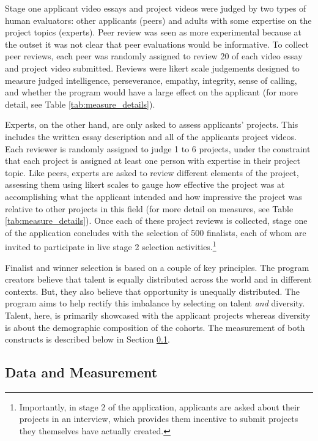 Stage one applicant video essays and project videos were judged by two types of human evaluators: other applicants (peers) and adults with some expertise on the project topics (experts). Peer review was seen as more experimental because at the outset it was not clear that peer evaluations would be informative. To collect peer reviews, each peer was randomly assigned to review 20 of each video essay and project video submitted. Reviews were likert scale judgements designed to measure judged intelligence, perseverance, empathy, integrity, sense of calling, and whether the program would have a large effect on the applicant (for more detail, see Table \ref{tab:measure_details}). 

Experts, on the other hand, are only asked to assess applicants' projects. This includes the written essay description and all of the applicants project videos. Each reviewer is randomly assigned to judge 1 to 6 projects, under the constraint that each project is assigned at least one person with expertise in their project topic. Like peers, experts are asked to review different elements of the project, assessing them using likert scales to gauge how effective the project was at accomplishing what the applicant intended and how impressive the project was relative to other projects in this field (for more detail on measures, see Table \ref{tab:measure_details}). Once each of these project reviews is collected, stage one of the application concludes with the selection of 500 finalists, each of whom are invited to participate in live stage 2 selection activities.\footnote{Importantly, in stage 2 of the application, applicants are asked about their projects in an interview, which provides them incentive to submit projects they themselves have actually created.} 

Finalist and winner selection is based on a couple of key principles. The program creators believe that talent is equally distributed across the world and in different contexts. But, they also believe that opportunity is unequally distributed. The program aims to help rectify this imbalance by selecting on talent \emph{and} diversity. Talent, here, is primarily showcased with the applicant projects whereas diversity is about the demographic composition of the cohorts. The measurement of both constructs is described below in Section \ref{subsec:data}. 

\subsection{Data and Measurement} \label{subsec:data}


